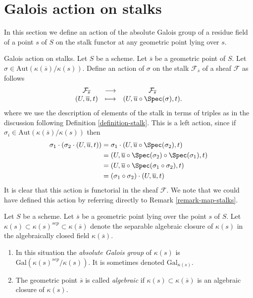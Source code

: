 \section{Galois action on stalks}
\label{section-galois-action-stalks}

\noindent
In this section we define an action of the absolute Galois group of a residue
field of a point $s$ of $S$ on the stalk functor at any geometric point lying
over $s$.

\medskip\noindent
Galois action on stalks.
Let $S$ be a scheme.
Let $\overline{s}$ be a geometric point of $S$.
Let $\sigma \in \text{Aut}(\kappa(\overline{s})/\kappa(s))$.
Define an action of $\sigma$ on the stalk $\mathcal{F}_{\overline{s}}$
of a sheaf $\mathcal{F}$ as follows
\begin{equation}
\label{equation-galois-action}
\begin{matrix}
\mathcal{F}_{\overline{s}} &
\longrightarrow &
\mathcal{F}_{\overline{s}} \\
(U, \overline{u}, t) &
\longmapsto &
(U, \overline{u} \circ \Spec(\sigma), t).
\end{matrix}
\end{equation}
where we use the description of elements of the stalk in terms of triples
as in the discussion following
Definition \ref{definition-stalk}.
This is a left action, since if
$\sigma_i \in \text{Aut}(\kappa(\overline{s})/\kappa(s))$
then
\begin{align*}
\sigma_1 \cdot (\sigma_2 \cdot (U, \overline{u}, t))
& =
\sigma_1 \cdot (U, \overline{u} \circ \Spec(\sigma_2), t) \\
& =
(U, \overline{u} \circ \Spec(\sigma_2) \circ \Spec(\sigma_1), t) \\
& =
(U, \overline{u} \circ \Spec(\sigma_1 \circ \sigma_2), t) \\
& =
(\sigma_1 \circ \sigma_2) \cdot (U, \overline{u}, t)
\end{align*}
It is clear that this action is functorial in the sheaf $\mathcal{F}$.
We note that we could have defined this action by referring directly to
Remark \ref{remark-map-stalks}.

\begin{definition}
\label{definition-algebraic-geometric-point}
Let $S$ be a scheme.
Let $\overline{s}$ be a geometric point lying over the point $s$ of $S$.
Let $\kappa(s) \subset \kappa(s)^{sep} \subset \kappa(\overline{s})$
denote the separable algebraic closure of $\kappa(s)$ in the algebraically
closed field $\kappa(\overline{s})$.
\begin{enumerate}
\item In this situation the {\it absolute Galois group} of $\kappa(s)$
is $\text{Gal}(\kappa(s)^{sep}/\kappa(s))$. It is sometimes denoted
$\text{Gal}_{\kappa(s)}$.
\item The geometric point $\overline{s}$ is called
{\it algebraic} if $\kappa(s) \subset \kappa(\overline{s})$ is
an algebraic closure of $\kappa(s)$.
\end{enumerate}
\end{definition}

